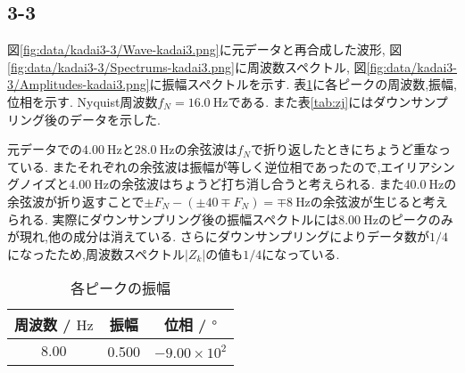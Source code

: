 \subsection*{3-3}
図\ref{fig:data/kadai3-3/Wave-kadai3.png}に元データと再合成した波形,
図\ref{fig:data/kadai3-3/Spectrums-kadai3.png}に周波数スペクトル,
図\ref{fig:data/kadai3-3/Amplitudes-kadai3.png}に振幅スペクトルを示す.
表\ref{tab:3-3}に各ピークの周波数,振幅,位相を示す.
Nyquist周波数$f_{N}=16.0\ \si{\hertz}$である.
また表\ref{tab:zj}にはダウンサンプリング後のデータを示した.

元データでの$4.00\ \si{\hertz}$と$28.0\ \si{\hertz}$の余弦波は$f_N$で折り返したときにちょうど重なっている.
またそれぞれの余弦波は振幅が等しく逆位相であったので,エイリアシングノイズと$4.00\ \si{\hertz}$の余弦波はちょうど打ち消し合うと考えられる.
また$40.0\ \si{\hertz}$の余弦波が折り返すことで$\pm F_N-(\pm40\mp F_N)=\mp8\ \si{\hertz}$の余弦波が生じると考えられる.
実際にダウンサンプリング後の振幅スペクトルには$8.00\ \si{\hertz}$のピークのみが現れ,他の成分は消えている.
さらにダウンサンプリングによりデータ数が$1/4$になったため,周波数スペクトル$|Z_k|$の値も$1/4$になっている.
\begin{table}[h]
\caption{各ピークの振幅}
\label{tab:3-3}
\centering
\begin{tabular}{ccc}
\hline
周波数 / $\si{\hertz}$ & 振幅  & 位相 / $\si{\degree}$ \\
\hline \hline
$8.00$&0.500&$-9.00\times10^{2}$\\
\hline
\end{tabular}
\end{table}